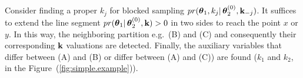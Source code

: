 Consider finding a proper $k_j$ 
for blocked sampling $pr(\boldsymbol\theta_1, k_j | \, 
\boldsymbol\theta_2^{(0)}, \textbf{k}_{-j})$. 
It suffices to extend the line segment $pr(\boldsymbol\theta_1 | \, 
\boldsymbol\theta_2^{(0)}, \textbf{k})>0$ in two sides to reach the point $x$ or 
$y$. In this way, the neighboring partition e.g.\ (B) and (C) and consequently 
their corresponding $\textbf{k}$ valuations are detected. 
Finally, the auxiliary variables that differ between (A) and (B) or differ between (A) and (C)) are found ($k_1$ and $k_2$, in the Figure~(\ref{fig:simple.example})). 

